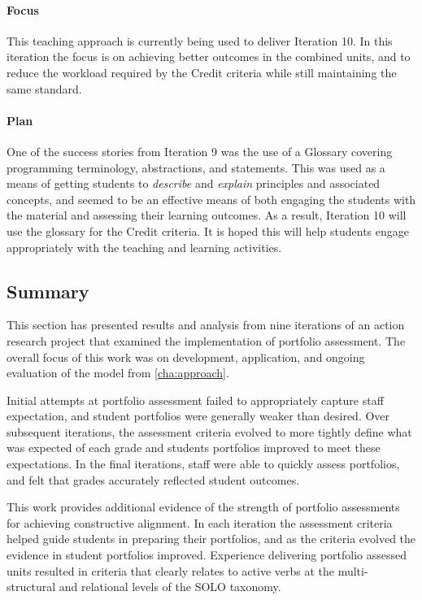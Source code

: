 \paragraph{Focus}
This teaching approach is currently being used to deliver Iteration 10. In this iteration the focus is on achieving better outcomes in the combined units, and to reduce the workload required by the Credit criteria while still maintaining the same standard.

\paragraph{Plan}
One of the success stories from Iteration 9 was the use of a Glossary covering programming terminology, abstractions, and statements. This was used as a means of getting students to \emph{describe} and \emph{explain} principles and associated concepts, and seemed to be an effective means of both engaging the students with the material and assessing their learning outcomes. As a result, Iteration 10 will use the glossary for the Credit criteria. It is hoped this will help students engage appropriately with the teaching and learning activities.


\subsection{Summary} %
\label{sub:action_summary}

This section has presented results and analysis from nine iterations of an action research project that examined the implementation of portfolio assessment. The overall focus of this work was on development, application, and ongoing evaluation of the model from \cref{cha:approach}.

Initial attempts at portfolio assessment failed to appropriately capture staff expectation, and student portfolios were generally weaker than desired. Over subsequent iterations, the assessment criteria evolved to more tightly define what was expected of each grade and students portfolios improved to meet these expectations. In the final iterations, staff were able to quickly assess portfolios, and felt that grades accurately reflected student outcomes.

This work provides additional evidence of the strength of portfolio assessments for achieving constructive alignment. In each iteration the assessment criteria helped guide students in preparing their portfolios, and as the criteria evolved the evidence in student portfolios improved. Experience delivering portfolio assessed units resulted in criteria that clearly relates to active verbs at the multi-structural and relational levels of the SOLO taxonomy.

